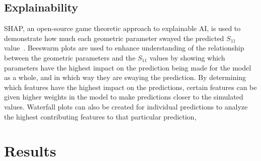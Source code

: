 \documentclass[conference]{IEEEtran}
\newenvironment{Figure}
    {\par\medskip\noindent\minipage{\linewidth}}
    {\endminipage\par\medskip}
\begin{document}




\subsection{Explainability}
SHAP, an open-source game theoretic approach to explainable AI, is used to demonstrate how much each geometric parameter swayed the predicted $S_{11}$ value~\cite{NIPS2017_7062}. Beeswarm plots are used to enhance understanding of the relationship between the geometric parameters and the $S_{11}$ values by showing which parameters have the highest impact on the prediction being made for the model as a whole, and in which way they are swaying the prediction. By determining which features have the highest impact on the predictions, certain features can be given higher weights in the model to make predictions closer to the simulated values. Waterfall plots can also be created for individual predictions to analyze the highest contributing features to that particular prediction,


\section{Results}
\end{document}
